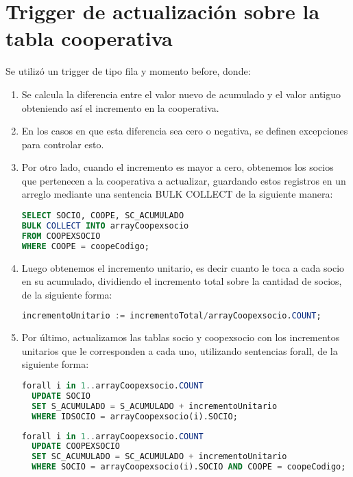 \documentclass{article}
\begin{document}
\section{Trigger de actualización sobre la tabla cooperativa}
Se utilizó un trigger de tipo fila y momento before, donde:
\begin{enumerate}
        \item Se calcula la diferencia entre el valor nuevo de acumulado y el valor antiguo obteniendo así el incremento en la cooperativa.
        \item En los casos en que esta diferencia sea cero o negativa, se definen excepciones para controlar esto.
        \item Por otro lado, cuando el incremento es mayor a cero, obtenemos los socios que pertenecen a la cooperativa a actualizar, guardando estos registros en un arreglo mediante una sentencia BULK COLLECT de la siguiente manera:
\begin{lstlisting}[language=SQL]
SELECT SOCIO, COOPE, SC_ACUMULADO 
BULK COLLECT INTO arrayCoopexsocio
FROM COOPEXSOCIO
WHERE COOPE = coopeCodigo;
\end{lstlisting}
\item Luego obtenemos el incremento unitario, es decir cuanto le toca a cada socio en su acumulado, dividiendo el incremento total sobre la cantidad de socios, de la siguiente forma:

\begin{lstlisting}[language=SQL]
incrementoUnitario := incrementoTotal/arrayCoopexsocio.COUNT;
\end{lstlisting}
\item Por último, actualizamos las tablas socio y coopexsocio con los incrementos unitarios que le corresponden a cada uno, utilizando sentencias forall, de la siguiente forma:
\begin{lstlisting}[language=SQL]
forall i in 1..arrayCoopexsocio.COUNT
  UPDATE SOCIO 
  SET S_ACUMULADO = S_ACUMULADO + incrementoUnitario
  WHERE IDSOCIO = arrayCoopexsocio(i).SOCIO;

\end{lstlisting}
\begin{lstlisting}[language=SQL]
forall i in 1..arrayCoopexsocio.COUNT
  UPDATE COOPEXSOCIO 
  SET SC_ACUMULADO = SC_ACUMULADO + incrementoUnitario
  WHERE SOCIO = arrayCoopexsocio(i).SOCIO AND COOPE = coopeCodigo;
\end{lstlisting}
\end{enumerate}
\end{document}
